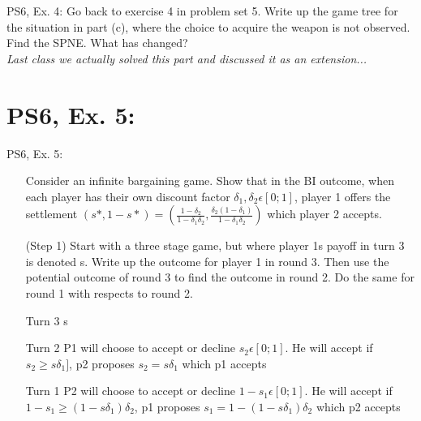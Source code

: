 \begin{frame}{PS6, Ex. 4: }
    Go back to exercise 4 in problem set 5. Write up the game tree for the situation in part (c), where the choice to acquire the weapon is not observed. Find the SPNE. What has changed?\\\bigskip
    \textit{Last class we actually solved this part and discussed it as an extension...}
\end{frame}




\section{PS6, Ex. 5: }

\begin{frame}{PS6, Ex. 5: }
    \begin{itemize}
    \item[] Consider an infinite bargaining game. Show that in the BI outcome, when each player has their own discount factor $\delta_1,\delta_2 \epsilon [0;1]$, player 1 offers the settlement $ (s*,1-s*)= \left( \frac{1-\delta_2}{1-\delta_1\delta_2},\frac{\delta_2(1-\delta_1)}{1-\delta_1\delta_2}\right)$ which player 2 accepts.
    \item[(Step 1)] Start with a three stage game, but where player 1s payoff in turn 3 is denoted s. Write up the outcome for player 1 in round 3. Then use the potential outcome of round 3 to find the outcome in round 2. Do the same for round 1 with respects to round 2.
    \end{itemize}
    \vfill\null
    \begin{itemize}
        \item[Turn 3] s
        \item[Turn 2] P1 will choose to accept or decline $s_2 \epsilon [0;1]$. He will accept if $s_2 \geq s\delta_1]$, p2 proposes $s_2 = s\delta_1$ which p1 accepts
        \item[Turn 1] P2 will choose to accept or decline $1-s_1 \epsilon [0;1]$. He will accept if $1-s_1 \geq (1-s\delta_1)\delta_2$, p1 proposes $s_1 = 1- (1-s\delta_1)\delta_2$ which p2 accepts
    \end{itemize}
     \vfill\null
\end{frame}

